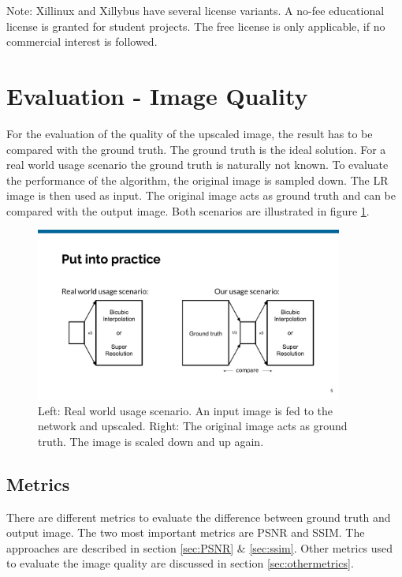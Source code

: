 \documentclass[
			fontsize = 12pt,
			paper = a4
			]
			{scrartcl}%
\newcommand{\?}{\ensuremath{^\texttt{\textbf [CITATION~NEEDED]}}}
\begin{document}
 Note: Xillinux and Xillybus have several license variants. A no-fee educational license is granted for student projects. The free license is only applicable, if no commercial interest is followed.

\newpage



\section{Evaluation - Image Quality}
\label{sec:imqual}

For the evaluation of the quality of the upscaled image, the result has to be compared with the ground truth. The ground truth is the ideal solution. For a real world usage scenario the ground truth is naturally not known. To evaluate the performance of the algorithm, the original image is sampled down. The LR image is then used as input. The original image acts as ground truth and can be compared with the output image. Both scenarios are illustrated in figure \ref{fig:gt}. 

\begin{figure}[H]
    \centering
    \includegraphics[width=0.9\textwidth]{fig/comparison}
    \caption{Left: Real world usage scenario. An input image is fed to the network and upscaled.  Right: The original image acts as ground truth. The image is scaled down and up again.}
    \label{fig:gt}
\end{figure}

\subsection{Metrics}
\label{sec:metrics}
 There are different metrics to evaluate the difference between ground truth and output image. The two most important metrics are PSNR and SSIM. The approaches are described in section \ref{sec:PSNR} \& \ref{sec:ssim}. Other metrics used to evaluate the image quality are discussed in section \ref{sec:othermetrics}.
\end{document}
